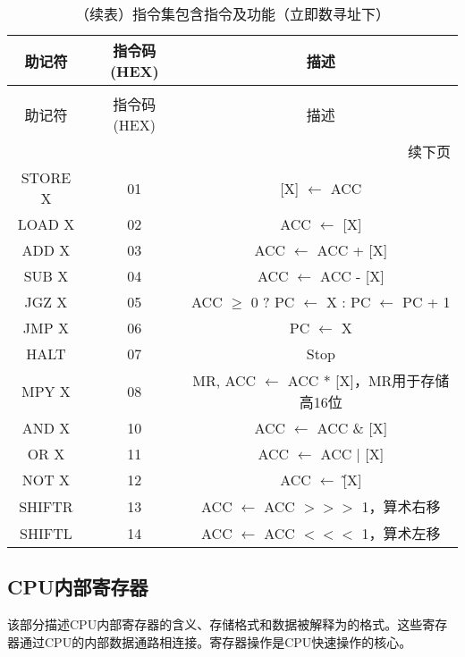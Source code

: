 \documentclass[lang=cn,a4paper,newtx]{elegantpaper}
\begin{document}
\begin{longtable}{c c c}
  \caption{指令集包含指令及功能（立即数寻址下）} \label{tab:ISA:instructions} \\
  \toprule
  助记符  & 指令码(HEX) & 描述 \\
  \midrule
  \endfirsthead
  
  \caption[]{（续表）指令集包含指令及功能（立即数寻址下）} \\
  \toprule
  助记符  & 指令码(HEX) & 描述 \\
  \midrule
  \endhead
  
  \midrule
  \multicolumn{3}{r}{续下页} \\
  \midrule
  \endfoot
  
  \bottomrule
  \endlastfoot
  
  STORE X &  01   & [X] $\leftarrow$ ACC  \\
  LOAD X  & 02    & ACC $\leftarrow$ [X]  \\
  ADD X   & 03    & ACC $\leftarrow$ ACC + [X]\\
  SUB X   & 04    & ACC $\leftarrow$ ACC - [X]\\
  JGZ X   & 05    & ACC $\geq$ 0 ? PC $\leftarrow$ X : PC $\leftarrow$ PC + 1\\
  JMP X   & 06    & PC $\leftarrow$ X\\
  HALT    & 07    & Stop\\
  MPY X   & 08    & MR, ACC $\leftarrow$ ACC * [X]，MR用于存储高16位 \\
  AND X   & 10    & ACC $\leftarrow$ ACC \& [X]\\
  OR X    & 11    & ACC $\leftarrow$ ACC | [X]\\
  NOT X   & 12    & ACC $\leftarrow$ \~[X] \\
  SHIFTR  & 13    & ACC $\leftarrow$ ACC $>>>$ 1，算术右移\\
  SHIFTL  & 14    & ACC $\leftarrow$ ACC $<<<$ 1，算术左移\\
\end{longtable}

\subsection{CPU内部寄存器}
该部分描述CPU内部寄存器的含义、存储格式和数据被解释为的格式。这些寄存器通过CPU的内部数据通路相连接。寄存器操作是CPU快速操作的核心。
\end{document}
